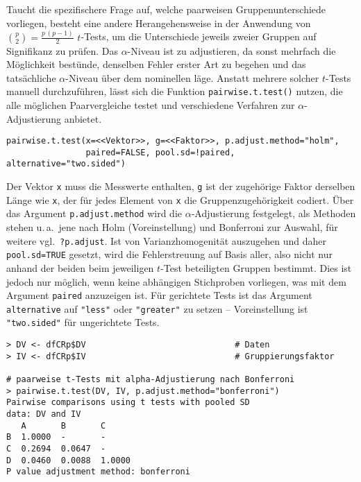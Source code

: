 Taucht die spezifischere Frage auf, welche paarweisen Gruppenunterschiede vorliegen, besteht eine andere Herangehensweise in der Anwendung von ${p \choose 2} = \frac{p \, (p-1)}{2}$ $t$-Tests, um die Unterschiede jeweils zweier Gruppen auf Signifikanz zu prüfen. Das $\alpha$-Niveau ist zu adjustieren, da sonst mehrfach die Möglichkeit bestünde, denselben Fehler erster Art zu begehen und das tatsächliche $\alpha$-Niveau über dem nominellen läge. Anstatt mehrere solcher $t$-Tests manuell durchzuführen, lässt sich die Funktion \lstinline!pairwise.t.test()! nutzen, die alle möglichen Paarvergleiche testet und verschiedene Verfahren zur $\alpha$-Adjustierung anbietet.
\begin{lstlisting}
pairwise.t.test(x=<<Vektor>>, g=<<Faktor>>, p.adjust.method="holm",
                paired=FALSE, pool.sd=!paired, alternative="two.sided")
\end{lstlisting}

Der Vektor \lstinline!x! muss die Messwerte enthalten, \lstinline!g! ist der zugehörige Faktor derselben Länge wie \lstinline!x!, der für jedes Element von \lstinline!x! die Gruppenzugehörigkeit codiert. Über das Argument \lstinline!p.adjust.method! wird die $\alpha$-Adjustierung festgelegt, als Methoden stehen u.\,a.\ jene nach Holm (Voreinstellung) und Bonferroni zur Auswahl, für weitere vgl.\ \lstinline!?p.adjust!. Ist von Varianzhomogenität auszugehen und daher \lstinline!pool.sd=TRUE! gesetzt, wird die Fehlerstreuung auf Basis aller, also nicht nur anhand der beiden beim jeweiligen $t$-Test beteiligten Gruppen bestimmt. Dies ist jedoch nur möglich, wenn keine abhängigen Stichproben vorliegen, was mit dem Argument \lstinline!paired! anzuzeigen ist. Für gerichtete Tests ist das Argument \lstinline!alternative! auf \lstinline!"less"! oder \lstinline!"greater"! zu setzen -- Voreinstellung ist \lstinline!"two.sided"! für ungerichtete Tests.
\begin{lstlisting}
> DV <- dfCRp$DV                              # Daten
> IV <- dfCRp$IV                              # Gruppierungsfaktor

# paarweise t-Tests mit alpha-Adjustierung nach Bonferroni
> pairwise.t.test(DV, IV, p.adjust.method="bonferroni")
Pairwise comparisons using t tests with pooled SD
data: DV and IV
   A       B       C
B  1.0000  -       -
C  0.2694  0.0647  -
D  0.0460  0.0088  1.0000
P value adjustment method: bonferroni
\end{lstlisting}

